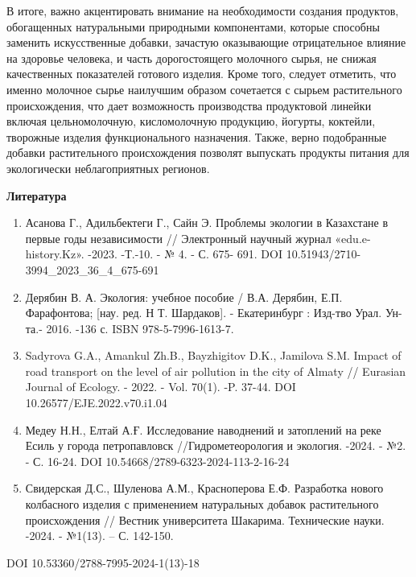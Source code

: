 {{В итоге, важно акцентировать внимание на необходимости создания
продуктов, обогащенных натуральными природными компонентами, которые
способны заменить искусственные добавки, зачастую оказывающие
отрицательное влияние на здоровье человека, и часть дорогостоящего
молочного сырья, не снижая качественных показателей готового изделия.
Кроме того, следует отметить, что именно молочное сырье наилучшим
образом сочетается с сырьем растительного происхождения, что дает
возможность производства продуктовой линейки включая цельномолочную,
кисломолочную продукцию, йогурты, коктейли, творожные изделия
функционального назначения. Также, верно подобранные добавки
растительного происхождения позволят выпускать продукты питания для
экологически неблагоприятных регионов.

{\bfseries Литература}

\begin{enumerate}
\def\labelenumi{\arabic{enumi}.}
\item
  Асанова Г., Адильбектеги Г., Сайн Э. Проблемы экологии в Казахстане в
  первые годы независимости // Электронный научный журнал
  «edu.e-history.Kz». -2023. -Т.-10. - № 4. - С. 675- 691. DOI
  10.51943/2710-3994\_2023\_36\_4\_675-691
\item
  Дерябин В. А. Экология: учебное пособие / В.А. Дерябин, Е.П.
  Фарафонтова; {[}нау. ред. Н Т. Шардаков{]}. - Екатеринбург : Изд-тво
  Урал. Ун-та.- 2016. -136 с. ISBN 978-5-7996-1613-7.
\item
  Sadyrova G.A., Amankul Zh.B., Bayzhigitov D.K., Jamilova S.M. Impact
  of road transport on the level of air pollution in the city of Almaty
  // Eurasian Journal of Ecology. - 2022. - Vol. 70(1). -P. 37-44. DOI
  10.26577/EJE.2022.v70.i1.04
\item
  Медеу Н.Н., Елтай А.Ғ. Исследование наводнений и затоплений на реке
  Есиль у города петропавловск //Гидрометеорология и экология. -2024. -
  №2. - С. 16-24. DOI 10.54668/2789-6323-2024-113-2-16-24
\item
  Свидерская Д.С., Шуленова А.М., Красноперова Е.Ф. Разработка нового
  колбасного изделия с применением натуральных добавок растительного
  происхождения // Вестник университета Шакарима. Технические науки.
  -2024. - №1(13). -- С. 142-150.
\end{enumerate}

DOI 10.53360/2788-7995-2024-1(13)-18

}}
